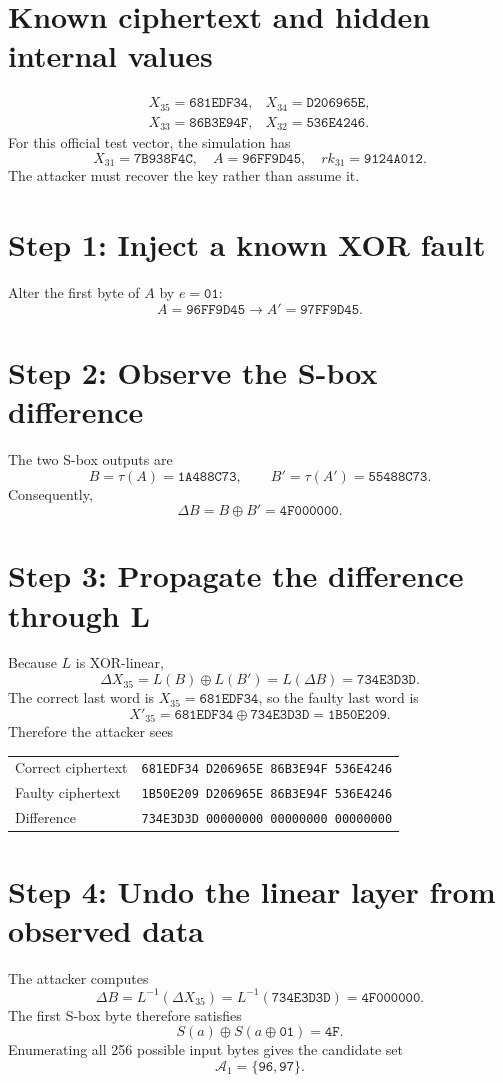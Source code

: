 \documentclass[11pt,a4paper]{report}
\newcommand{\hex}[1]{\texttt{#1}}
\newcommand{\xor}{\mathbin{\oplus}}
\begin{document}
\section{Known ciphertext and hidden internal values}
\[\begin{array}{ll}X_{35}=\hex{681EDF34},&X_{34}=\hex{D206965E},\\X_{33}=\hex{86B3E94F},&X_{32}=\hex{536E4246}.\end{array}\]
For this official test vector, the simulation has
\[X_{31}=\hex{7B938F4C},\quad A=\hex{96FF9D45},\quad rk_{31}=\hex{9124A012}.\]
The attacker must recover the key rather than assume it.
\section{Step 1: Inject a known XOR fault}
Alter the first byte of \(A\) by \(e=\hex{01}\):
\[A=\hex{96FF9D45}\longrightarrow A'=\hex{97FF9D45}.\]
\section{Step 2: Observe the S-box difference}
The two S-box outputs are
\[B=\tau(A)=\hex{1A488C73},\qquad B'=\tau(A')=\hex{55488C73}.\]
Consequently,
\[\Delta B=B\xor B'=\hex{4F000000}.\]
\section{Step 3: Propagate the difference through L}
Because \(L\) is XOR-linear,
\[\Delta X_{35}=L(B)\xor L(B')=L(\Delta B)=\hex{734E3D3D}.\]
The correct last word is \(X_{35}=\hex{681EDF34}\), so the faulty last word is
\[X'_{35}=\hex{681EDF34}\xor\hex{734E3D3D}=\hex{1B50E209}.\]
Therefore the attacker sees
\begin{center}\begin{tabular}{ll}\toprule Correct ciphertext&\hex{681EDF34 D206965E 86B3E94F 536E4246}\\Faulty ciphertext&\hex{1B50E209 D206965E 86B3E94F 536E4246}\\Difference&\hex{734E3D3D 00000000 00000000 00000000}\\\bottomrule\end{tabular}\end{center}
\section{Step 4: Undo the linear layer from observed data}
The attacker computes
\[\Delta B=L^{-1}(\Delta X_{35})=L^{-1}(\hex{734E3D3D})=\hex{4F000000}.\]
The first S-box byte therefore satisfies
\[S(a)\xor S(a\xor\hex{01})=\hex{4F}.\]
Enumerating all 256 possible input bytes gives the candidate set
\[\mathcal A_1=\{\hex{96},\hex{97}\}.\]
\end{document}
